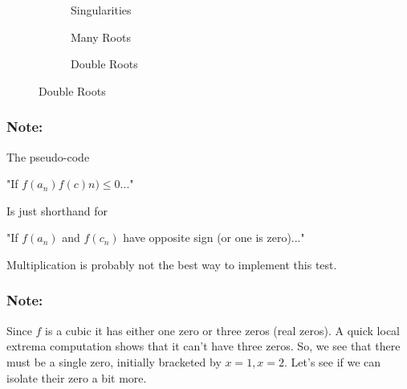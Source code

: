     \begin{figure}
      \centering
      \begin{subfigure}[b]{0.3\textwidth}
        \resizebox{\textwidth}{!}{
          
        }
        \caption{Singularities}
      \end{subfigure}
      \begin{subfigure}[b]{0.3\textwidth}
        \resizebox{\textwidth}{!}{
          
        }
        \caption{Many Roots}
      \end{subfigure}
      \begin{subfigure}[b]{0.3\textwidth}
        \resizebox{\textwidth}{!}{
          
        }
        \caption{Double Roots}
      \end{subfigure}
      \label{fig:difficult-root-finding}
    \end{figure}

\newpage

    \subsubsection{Note:}
        \begin{description}
            \item The pseudo-code
            \item "If $f(a_n)f(c)n) \leq 0$..."
            \item Is just shorthand for
            \item "If $f(a_n)$ and $f(c_n)$ have opposite sign (or one is zero)..."
            \item Multiplication is probably not the best way to implement this test.
        \end{description}
    
    \begin{figure}
      \centering
      
      \label{fig:bisection_example}
    \end{figure}
    \subsubsection{Note:}
        \begin{description}
            \item Since $f$ is a cubic it has either one zero or three zeros (real zeros).
            A quick local extrema computation shows that it can't have three zeros. 
            So, we see that there must be a single zero, initially bracketed by $x = 1, x = 2$.
            Let's see if we can isolate their zero a bit more.
        \end{description}
            
